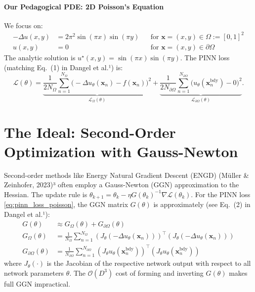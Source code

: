 \documentclass[12pt,a4paper]{article}
\newcommand{\vect}[1]{\mathbf{#1}} %
\begin{document}
\paragraph{Our Pedagogical PDE: 2D Poisson's Equation}
We focus on:
\begin{align*}
-\Delta u(x,y) &= 2\pi^{2}\sin(\pi x)\sin(\pi y) && \text{for }\vect{x}=(x,y) \in \Omega := [0,1]^{2} \\
u(x,y) &= 0 && \text{for }\vect{x}=(x,y) \in \partial\Omega
\end{align*}
The analytic solution is \(u^\star(x,y)=\sin(\pi x)\sin(\pi y)\). The PINN loss (matching Eq.~(1) in Dangel et al.¹) is:
\begin{equation}
\mathcal{L}(\theta) = \underbrace{\frac{1}{2N_\Omega}\sum_{n=1}^{N_\Omega}
\bigl(-\Delta u_\theta(\vect{x}_n) - f(\vect{x}_n)\bigr)^{2}}_{\mathcal{L}_\Omega(\theta)}
+
\underbrace{\frac{1}{2N_{\partial\Omega}}\sum_{n=1}^{N_{\partial\Omega}}
\bigl(u_\theta(\vect{x}_n^{\text{bdy}}) - 0\bigr)^{2}}_{\mathcal{L}_{\partial\Omega}(\theta)}.
\label{eq:pinn_loss_poisson}
\end{equation}

\section{The Ideal: Second-Order Optimization with Gauss-Newton}
Second-order methods like Energy Natural Gradient Descent (ENGD) (Müller \& Zeinhofer, 2023)³ often employ a Gauss-Newton (GGN) approximation to the Hessian. The update rule is \( \theta_{k+1} = \theta_k - \eta G(\theta_k)^{-1}\nabla\mathcal{L}(\theta_k) \). For the PINN loss \eqref{eq:pinn_loss_poisson}, the GGN matrix \(G(\theta)\) is approximately (see Eq.~(2) in Dangel et al.¹):
\begin{align}
G(\theta) &\approx G_\Omega(\theta) + G_{\partial\Omega}(\theta) \nonumber \\
G_\Omega(\theta) &= \frac{1}{N_\Omega} \sum_{n=1}^{N_\Omega} \left(J_\theta (-\Delta u_\theta(\vect{x}_n))\right)^{\top} \left(J_\theta (-\Delta u_\theta(\vect{x}_n))\right) \\
G_{\partial\Omega}(\theta) &= \frac{1}{N_{\partial\Omega}} \sum_{n=1}^{N_{\partial\Omega}} \left(J_\theta u_\theta(\vect{x}_n^{\text{bdy}})\right)^{\top} \left(J_\theta u_\theta(\vect{x}_n^{\text{bdy}})\right)
\end{align}
where \(J_\theta(\cdot)\) is the Jacobian of the respective network output with respect to all network parameters \(\theta\). The \(\mathcal{O}(D^3)\) cost of forming and inverting \(G(\theta)\) makes full GGN impractical.
\end{document}
